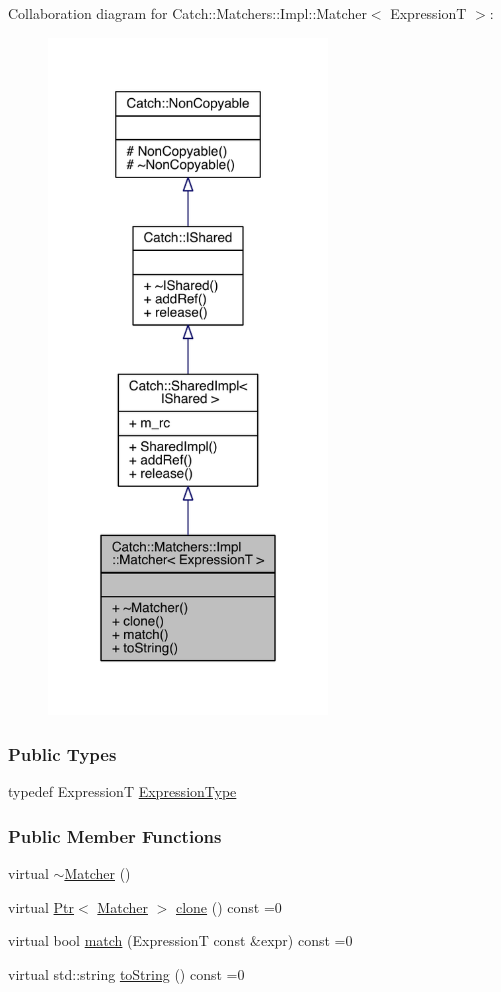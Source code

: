 Collaboration diagram for Catch\+:\+:Matchers\+:\+:Impl\+:\+:Matcher$<$ Expression\+T $>$\+:\nopagebreak
\begin{figure}[H]
\begin{center}
\leavevmode
\includegraphics[width=210pt]{a00337}
\end{center}
\end{figure}
\subsubsection*{Public Types}
\begin{DoxyCompactItemize}
\item 
typedef Expression\+T \hyperlink{a00047_a7f5068cbacd1eed06cf243e63446e7e1}{Expression\+Type}
\end{DoxyCompactItemize}
\subsubsection*{Public Member Functions}
\begin{DoxyCompactItemize}
\item 
virtual \hyperlink{a00047_a55e537214a78bbba59f53d3e30336a61}{$\sim$\+Matcher} ()
\item 
virtual \hyperlink{a00065}{Ptr}$<$ \hyperlink{a00047}{Matcher} $>$ \hyperlink{a00047_a9d31e5018fea24efa08c3cbf5aa4475d}{clone} () const =0
\item 
virtual bool \hyperlink{a00047_a8c1c5511ce1f3738a45e6901b558f583}{match} (Expression\+T const \&expr) const =0
\item 
virtual std\+::string \hyperlink{a00047_a091bcc37e589967d7e10fc7790d820e2}{to\+String} () const =0
\end{DoxyCompactItemize}
